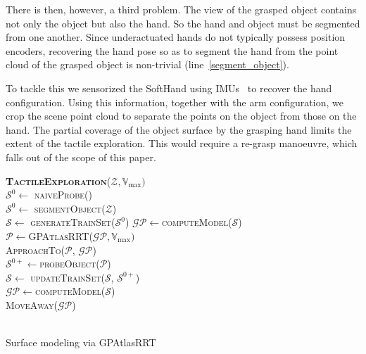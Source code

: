 There is then, however, a third problem. The view of the grasped object contains not only the object but also the hand. So the hand and object must be segmented from one another. Since underactuated hands do not typically possess position encoders, recovering the hand pose so as to segment the hand from the point cloud of the grasped object is non-trivial (line~\ref{segment_object}).

To tackle this we sensorized the SoftHand using IMUs~\cite{Santaera2015Lowcost} to recover the hand configuration. Using this information, together with the arm configuration, we crop the scene point cloud to separate the points on the object from those on the hand. The partial coverage of the object surface by the grasping hand limits the extent of the tactile exploration. This would require a re-grasp manoeuvre, which falls out of the scope of this paper.

\begin{algorithm}[t]
\textbf{\textsc{TactileExploration}}($\mathcal{Z}, \mathbb{V}_{\max})$\\ %
\LinesNumbered
\DontPrintSemicolon
\SetAlgoVlined {} 
  \label{ini_gp} 
  {
    $\mathcal{S}^0 \leftarrow $ \textsc{naiveProbe}() \\
  }
  \Else
  {
  \label{segment_object}  $\mathcal{S}^0 \leftarrow $ \textsc{segmentObject}($\mathcal{Z}$) \\
  }
  $\mathcal{S} \leftarrow$ \textsc{generateTrainSet}($\mathcal{S}^0$)
  $\mathcal{GP} \leftarrow $\textsc{computeModel}($\mathcal{S}$) \label{fini_ini_gp} \\
  {
    $\mathcal{P} \leftarrow $\textsc{GPAtlasRRT}($\mathcal{GP}, \mathbb{V}_{\max})$ \label{exploration} \\
    {
      \textsc{ApproachTo}($\mathcal{P}$, $\mathcal{GP}$) \label{approach} \\
      $\mathcal{S}^{0+} \leftarrow $\textsc{probeObject}($\mathcal{P}$) \label{probe} \\
      $\mathcal{S} \leftarrow$ \textsc{updateTrainSet($\mathcal{S}$, $\mathcal{S}^{0+}$)} \label{update_training} \\
      $\mathcal{GP} \leftarrow $\textsc{computeModel}($\mathcal{S}$) \label{re-compute} \\
      \textsc{MoveAway}($\mathcal{GP}$) \label{away} \\
    }
    \Else
    { 
       \label{solutionfound} \\
    }
  }
\caption{Surface modeling via GPAtlasRRT} \label{alg:solution}
\end{algorithm}

